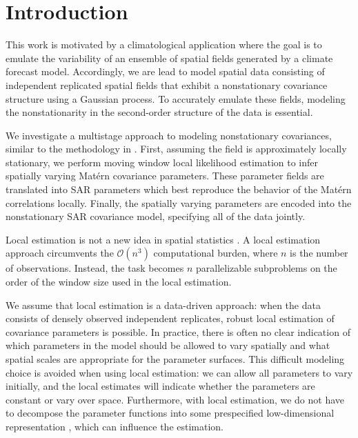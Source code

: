 \documentclass[review]{elsarticle}
\begin{document}
\linenumbers

\section{Introduction}

This work is motivated by a climatological application where the goal is to emulate the variability of an ensemble of spatial fields generated by a climate forecast model. Accordingly, we are lead to model spatial data consisting of independent replicated spatial fields that exhibit a nonstationary covariance structure using a Gaussian process. To accurately emulate these fields, modeling the nonstationarity in the second-order structure of the data is essential. 


We investigate a multistage approach to modeling nonstationary covariances, similar to the methodology in \cite{nychka2018modeling}. First, assuming the field is approximately locally stationary, we perform moving window local likelihood estimation to infer spatially varying Mat\'ern covariance parameters. These parameter fields are translated into SAR parameters which best reproduce the behavior of the Mat\'ern correlations locally. Finally, the spatially varying parameters are encoded into the nonstationary SAR covariance model, specifying all of the data jointly.



Local estimation is not a new idea in spatial statistics \cite{haas1990kriging, haas1990lognormal, ver2004flexible, risser2015local}. A local estimation approach circumvents the $\mathcal{O}(n^3)$ computational burden, where $n$ is the number of observations. Instead, the task becomes $n$ parallelizable subproblems on the order of the window size used in the local estimation.

We assume that local estimation is a data-driven approach: when the data consists of densely observed independent replicates, robust local estimation of covariance parameters is possible. In practice, there is often no clear indication of which parameters in the model should be allowed to vary spatially \cite{fuglstad2015does} and what spatial scales are appropriate for the parameter surfaces. This difficult modeling choice is avoided when using local estimation: we can allow all parameters to vary initially, and the local estimates will indicate whether the parameters are constant or vary over space. Furthermore, with local estimation, we do not have to decompose the parameter functions into some prespecified low-dimensional representation \cite{fuglstad2015exploring, risser2016nonstationary}, which can influence the estimation. 
\end{document}
